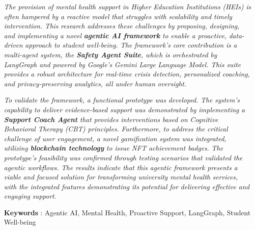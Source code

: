 \textit{
	The provision of mental health support in Higher Education Institutions (HEIs) is often hampered by a reactive model that struggles with scalability and timely intervention. This research addresses these challenges by proposing, designing, and implementing a novel \textbf{agentic AI framework} to enable a proactive, data-driven approach to student well-being. The framework’s core contribution is a multi-agent system, the \textbf{Safety Agent Suite}, which is orchestrated by LangGraph and powered by Google’s Gemini Large Language Model. This suite provides a robust architecture for real-time crisis detection, personalized coaching, and privacy-preserving analytics, all under human oversight.
}

\textit{
	To validate the framework, a functional prototype was developed. The system's capability to deliver evidence-based support was demonstrated by implementing a \textbf{Support Coach Agent} that provides interventions based on Cognitive Behavioral Therapy (CBT) principles. Furthermore, to address the critical challenge of user engagement, a novel gamification system was integrated, utilizing \textbf{blockchain technology} to issue NFT achievement badges. The prototype's feasibility was confirmed through testing scenarios that validated the agentic workflows. The results indicate that this agentic framework presents a viable and focused solution for transforming university mental health services, with the integrated features demonstrating its potential for delivering effective and engaging support.
}

\noindent\textbf{Keywords} : Agentic AI, Mental Health, Proactive Support, LangGraph, Student Well-being